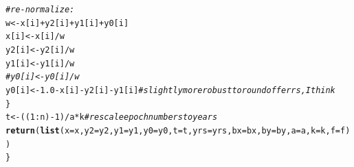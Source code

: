 \documentclass{article}\usepackage[]{graphicx}\usepackage[]{color}
\makeatletter
\newcommand{\hlnum}[1]{\textcolor[rgb]{0.686,0.059,0.569}{#1}}%
\newcommand{\hlcom}[1]{\textcolor[rgb]{0.678,0.584,0.686}{\textit{#1}}}%
\newcommand{\hlopt}[1]{\textcolor[rgb]{0,0,0}{#1}}%
\newcommand{\hlstd}[1]{\textcolor[rgb]{0.345,0.345,0.345}{#1}}%
\newcommand{\hlkwb}[1]{\textcolor[rgb]{0.69,0.353,0.396}{#1}}%
\newcommand{\hlkwc}[1]{\textcolor[rgb]{0.333,0.667,0.333}{#1}}%
\newcommand{\hlkwd}[1]{\textcolor[rgb]{0.737,0.353,0.396}{\textbf{#1}}}%
\newenvironment{kframe}{%
 \def\at@end@of@kframe{}%
 \ifinner\ifhmode%
  \def\at@end@of@kframe{\end{minipage}}%
  \begin{minipage}{\columnwidth}%
 \fi\fi%
 \def\FrameCommand##1{\hskip\@totalleftmargin \hskip-\fboxsep
 \colorbox{shadecolor}{##1}\hskip-\fboxsep
     \hskip-\linewidth \hskip-\@totalleftmargin \hskip\columnwidth}%
 \MakeFramed {\advance\hsize-\width
   \@totalleftmargin\z@ \linewidth\hsize
   \@setminipage}}%
 {\par\unskip\endMakeFramed%
 \at@end@of@kframe}
\newenvironment{knitrout}{}{} %
\makeatother
\begin{document}
\begin{knitrout}
\begin{kframe}
\begin{alltt}
    \hlcom{# re-normalize:}
    \hlstd{w} \hlkwb{<-} \hlstd{x[i]}\hlopt{+}\hlstd{y2[i]}\hlopt{+}\hlstd{y1[i]}\hlopt{+}\hlstd{y0[i]}
    \hlstd{x[i]}  \hlkwb{<-}  \hlstd{x[i]}\hlopt{/}\hlstd{w}
    \hlstd{y2[i]} \hlkwb{<-} \hlstd{y2[i]}\hlopt{/}\hlstd{w}
    \hlstd{y1[i]} \hlkwb{<-} \hlstd{y1[i]}\hlopt{/}\hlstd{w}
   \hlcom{#y0[i] <- y0[i]/w}
    \hlstd{y0[i]} \hlkwb{<-} \hlnum{1.0}\hlopt{-}\hlstd{x[i]}\hlopt{-}\hlstd{y2[i]}\hlopt{-}\hlstd{y1[i]} \hlcom{# slightly more robust to roundoff errs, I think}
  \hlstd{\}}
  \hlstd{t} \hlkwb{<-} \hlstd{((}\hlnum{1}\hlopt{:}\hlstd{n)}\hlopt{-}\hlnum{1}\hlstd{)}\hlopt{/}\hlstd{a}\hlopt{*}\hlstd{k} \hlcom{# rescale epoch numbers to years}
  \hlkwd{return}\hlstd{(}\hlkwd{list}\hlstd{(}\hlkwc{x}\hlstd{=x,}\hlkwc{y2}\hlstd{=y2,}\hlkwc{y1}\hlstd{=y1,}\hlkwc{y0}\hlstd{=y0,}\hlkwc{t}\hlstd{=t,}\hlkwc{yrs}\hlstd{=yrs,}\hlkwc{bx}\hlstd{=bx,}\hlkwc{by}\hlstd{=by,}\hlkwc{a}\hlstd{=a,}\hlkwc{k}\hlstd{=k,}\hlkwc{f}\hlstd{=f))}
\hlstd{\}}


\end{alltt}
\end{kframe}
\end{knitrout}
\end{document}
